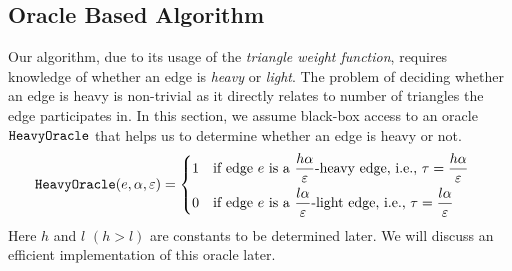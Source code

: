 















\subsection{Oracle Based Algorithm}
\label{ssec:oracle-algo}
Our algorithm, due to its usage of the \emph{triangle weight function}, requires knowledge of whether an edge is \emph{heavy} or \emph{light}. The problem of deciding whether an edge is heavy is non-trivial as it directly relates to number of triangles the edge participates in. In this section, we assume black-box access to an oracle $\texttt{HeavyOracle}{}$ that helps us to determine whether an edge is heavy or not. 
\begin{align*}
    \texttt{HeavyOracle}(e,\alpha,\varepsilon) &=\begin{dcases}
        1 &\text{if edge $e$ is a $\frac{h\alpha}{\varepsilon}$-heavy edge, i.e., $\tau = \frac{h\alpha}{\varepsilon}$}\\
        0 &\text{if edge $e$ is a $\frac{l\alpha}{\varepsilon}$-light edge, i.e., $\tau = \frac{l\alpha}{\varepsilon}$}
    \end{dcases}
\end{align*}
Here $h$ and $l$ $(h > l)$ are constants to be determined later.  We will discuss an efficient 
implementation of this oracle later. 
\iffalse{
The algorithm that we propose in this section can be thought of as estimating a weight function $\weightfunc$ as $\empweightfunc$. If the estimate $\empweightfunc$ is an unbiased estimate of the true $\weightfunc$, 
}\fi

